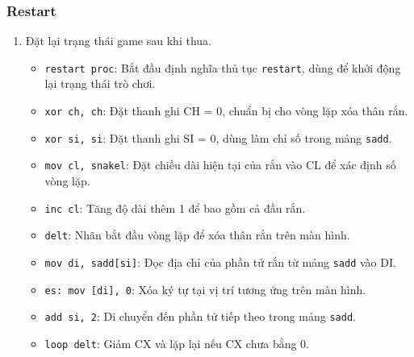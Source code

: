 \documentclass[12pt]{article}
\begin{document}
\subsubsection*{Restart}
\begin{enumerate}[label=\textbf{\arabic*.}]
    \begin{figure}[H]
  \centering
  \texttt{[image: pics/restart.png]}
\end{figure}
    \item \texttt{}Đặt lại trạng thái game sau khi thua.
    
    \begin{itemize}
        \item \texttt{restart proc}: Bắt đầu định nghĩa thủ tục \texttt{restart}, dùng để khởi động lại trạng thái trò chơi.
        \item \texttt{xor ch, ch}: Đặt thanh ghi CH = 0, chuẩn bị cho vòng lặp xóa thân rắn.
        \item \texttt{xor si, si}: Đặt thanh ghi SI = 0, dùng làm chỉ số trong mảng \texttt{sadd}.
        \item \texttt{mov cl, snakel}: Đặt chiều dài hiện tại của rắn vào CL để xác định số vòng lặp.
        \item \texttt{inc cl}: Tăng độ dài thêm 1 để bao gồm cả đầu rắn.
        \item \texttt{delt}: Nhãn bắt đầu vòng lặp để xóa thân rắn trên màn hình.
        \item \texttt{mov di, sadd[si]}: Đọc địa chỉ của phần tử rắn từ mảng \texttt{sadd} vào DI.
        \item \texttt{es: mov [di], 0}: Xóa ký tự tại vị trí tương ứng trên màn hình.
        \item \texttt{add si, 2}: Di chuyển đến phần tử tiếp theo trong mảng \texttt{sadd}.
        \item \texttt{loop delt}: Giảm CX và lặp lại nếu CX chưa bằng 0.
    \end{itemize}
    

\end{enumerate}
\end{document}

